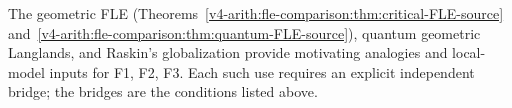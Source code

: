 \begin{remark}
\label{v4-arith:fle-comparison:rem:integration-rule}
The geometric FLE (Theorems~\ref{v4-arith:fle-comparison:thm:critical-FLE-source}
and~\ref{v4-arith:fle-comparison:thm:quantum-FLE-source}), quantum
geometric Langlands, and Raskin's globalization provide motivating
analogies and local-model inputs for F1, F2, F3. Each such use
requires an explicit independent bridge; the bridges are the
conditions listed above.
\end{remark}
